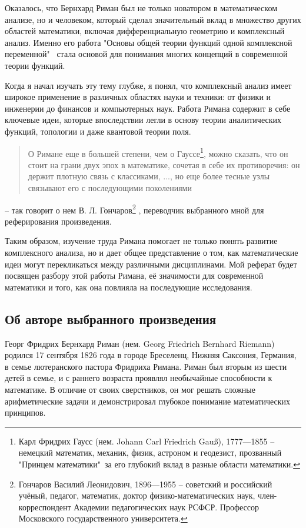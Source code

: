 \documentclass[a4paper,12pt]{article}
\theoremstyle{remark}
\begin{document}
Оказалось, что Бернхард Риман был не только новатором в математическом
анализе, но и человеком, который сделал значительный вклад в множество
других областей математики, включая дифференциальную геометрию и комплексный анализ.
Именно его работа "Основы общей теории функций одной комплексной
переменной"\ \cite{Dissertation} стала основой
для понимания многих концепций в современной теории функций.

Когда я начал изучать эту тему глубже, я понял, что комплексный анализ
имеет широкое применение в различных областях науки и техники:
от физики и инженерии до финансов и компьютерных наук. Работа
Римана содержит в себе ключевые идеи, которые впоследствии легли
в основу теории аналитических функций, топологии и даже квантовой
теории поля.
\begin{quotation}
  О Римане еще в большей степени, чем о Гауссе\footnote{
    Карл Фридрих Гаусс (нем. Johann Carl Friedrich Gauß), 1777—1855 --
    немецкий математик, механик, физик, астроном и геодезист, прозванный "Принцем математики"\
    за его глубокий вклад в разные области математики.
  }, можно сказать,
  что он стоит на грани двух эпох в математике, сочетая в себе их
  противоречия: он держит плотную связь с классиками, ..., но еще
  более тесные узлы связывают его с последующими поколениями
\end{quotation}
-- так говорит о нем В. Л. Гончаров\footnote{
  Гончаров Василий Леонидович, 1896—1955 --
  советский и российский учёный, педагог, математик, доктор физико-математических
  наук, член-корреспондент Академии педагогических наук РСФСР.
  Профессор Московского государственного университета.
} \cite{Essays}, переводчик выбранного мной для реферирования произведения.

Таким образом, изучение труда Римана помогает не только понять
развитие комплексного анализа, но и дает общее представление о том,
как математические идеи могут перекликаться между различными дисциплинами.
Мой реферат будет посвящен разбору этой работы Римана,
её значимости для современной математики и того,
как она повлияла на последующие исследования.

\subsection{Об авторе выбранного произведения}

Георг Фридрих Бернхард Риман (нем. Georg Friedrich Bernhard Riemann) родился
17 сентября 1826 года в городе Бреселенц, Нижняя Саксония,
Германия, в семье лютеранского пастора Фридриха Римана.
Риман был вторым из шести детей в семье, и с раннего возраста
проявлял необычайные способности к математике. В отличие от
своих сверстников, он мог решать сложные арифметические задачи
и демонстрировал глубокое понимание математических принципов.
\end{document}

